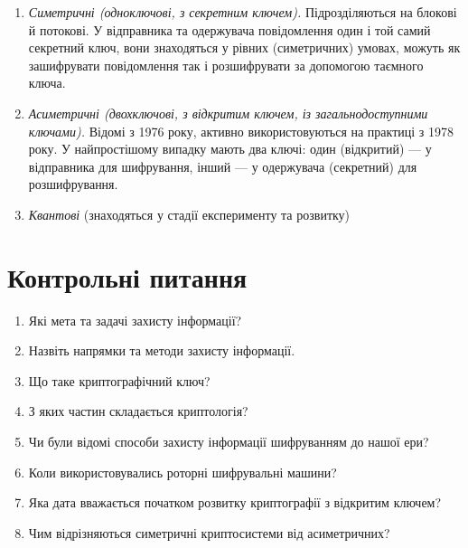 \begin{enumerate}
    \item \textit{Симетричні (одноключові, з секретним ключем).}
        Підрозділяються на блокові й потокові.
        У відправника та одержувача повідомлення один і той самий
        секретний ключ, вони знаходяться у рівних (симетричних) умовах,
        можуть як зашифрувати повідомлення так і  розшифрувати
        за допомогою таємного ключа.
    \item \textit{Асиметричні (двохключові, з відкритим ключем, із
        загальнодоступними ключами).}
        Відомі з 1976 року, активно використовуються на практиці з 1978 року.
        У найпростішому випадку мають два ключі: один (відкритий)
        --- у відправника для шифрування, інший --- у одержувача (секретний) для
        розшифрування.
    \item \textit{Квантові} (знаходяться у стадії експерименту та розвитку)
\end{enumerate}

\section{Контрольні питання}
\begin{enumerate}
    \item Які  мета та задачі захисту інформації?
    \item Назвіть напрямки та методи захисту інформації.
    \item Що таке криптографічний ключ?
    \item З яких частин складається криптологія?
    \item Чи були відомі способи захисту інформації шифруванням до нашої ери?
    \item Коли використовувались роторні шифрувальні машини?
    \item Яка дата вважається початком розвитку криптографії
        з відкритим  ключем?
    \item Чим відрізняються симетричні криптосистеми від асиметричних?
\end{enumerate}

